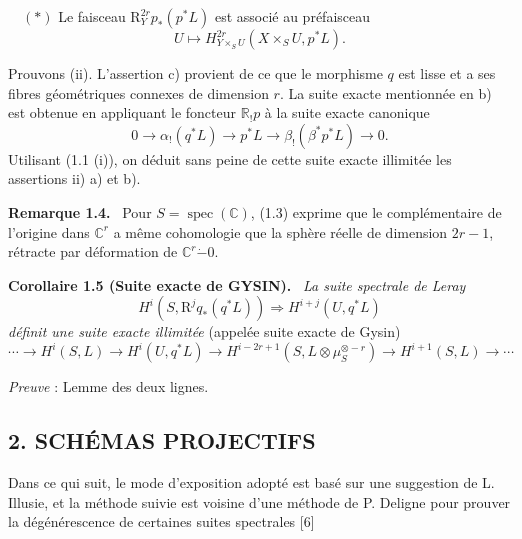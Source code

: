 \documentclass[11pt]{article}
\newenvironment{statement}[1]{\par\medskip\noindent\textbf{#1.}\ }{\par\medskip}
\newcommand{\R}{\mathbb{R}}\newcommand{\RHomCore}{\mathbb{R}\mathrm{Hom}}
\providecommand{\R}{\mathrm R}
\begin{document}
\(\quad (*)\) Le faisceau $\mathrm{R}_Y^{2r}p_*(p^*L)$ est associé au préfaisceau
\[
U\longmapsto H^{2r}_{Y\times_S U}(X\times_S U,p^*L).
\]

Prouvons (ii). L'assertion c) provient de ce que le morphisme $q$ est lisse et a ses fibres géométriques connexes de dimension $r$. La suite exacte mentionnée en b) est obtenue en appliquant le foncteur $\R_!p$ à la suite exacte canonique
\[
0\longrightarrow \alpha_!(q^*L)\longrightarrow p^*L\longrightarrow \beta_!(\beta^*p^*L)\longrightarrow 0.
\]
Utilisant (1.1 (i)), on déduit sans peine de cette suite exacte illimitée les assertions ii) a) et b).

\begin{statement}{Remarque 1.4}
Pour $S=\operatorname{spec}(\mathbb C)$, (1.3) exprime que le complémentaire de l'origine dans $\mathbb C^r$ a même cohomologie que la sphère réelle de dimension $2r-1$, rétracte par déformation de $\mathbb C^r\mathbin{\dot{-}}0$.
\end{statement}

\begin{statement}{Corollaire 1.5 (Suite exacte de GYSIN)}
\emph{La suite spectrale de Leray}
\[
H^i(S,\mathrm{R}^j q_*(q^*L))\Rightarrow H^{i+j}(U,q^*L)
\]
\emph{définit une suite exacte illimitée} (appelée suite exacte de Gysin)
\[
\cdots\longrightarrow H^i(S,L)\longrightarrow H^i(U,q^*L)\longrightarrow
H^{i-2r+1}(S,L\otimes\mu_S^{\otimes -r})\longrightarrow H^{i+1}(S,L)\longrightarrow\cdots
\]
\end{statement}

\emph{Preuve} : Lemme des deux lignes.

\subsection*{2. SCHÉMAS PROJECTIFS}

Dans ce qui suit, le mode d'exposition adopté est basé sur une suggestion de L. Illusie, et la méthode suivie est voisine d'une méthode de P. Deligne pour prouver la dégénérescence de certaines suites spectrales [6]
\end{document}
